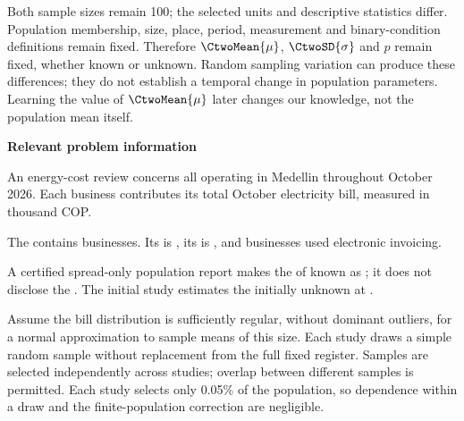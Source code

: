Both sample sizes remain 100; the selected units and descriptive statistics differ. Population membership, size, place, period, measurement and binary-condition definitions remain fixed. Therefore $\CtwoMean{\mu}$, $\CtwoSD{\sigma}$ and $p$ remain fixed, whether known or unknown. Random sampling variation can produce these differences; they do not establish a temporal change in population parameters. Learning the value of $\CtwoMean{\mu}$ later changes our knowledge, not the population mean itself.

\secInicio[][sec:p1]

\clearpage



\textbf{Relevant problem information}

\begin{probleminfoexcerpt}
An energy-cost review concerns all     operating in Medellin throughout October 2026. Each business contributes its total October electricity bill, measured in thousand COP.
\end{probleminfoexcerpt}

\begin{probleminfoexcerpt}
The     contains  businesses. Its   is   , its    is   , and  businesses used electronic invoicing.
\end{probleminfoexcerpt}

\begin{probleminfoexcerpt}
A certified spread-only population report makes the    of  known as   ; it does not disclose the   . The initial study estimates the initially unknown   at  .
\end{probleminfoexcerpt}

\begin{probleminfoexcerpt}
Assume the bill distribution is sufficiently regular, without dominant outliers, for a normal approximation to sample means of this size. Each study draws a simple random sample without replacement from the full fixed register. Samples are selected independently across studies; overlap between different samples is permitted. Each study selects only 0.05\% of the population, so dependence within a draw and the finite-population correction are negligible.
\end{probleminfoexcerpt}

